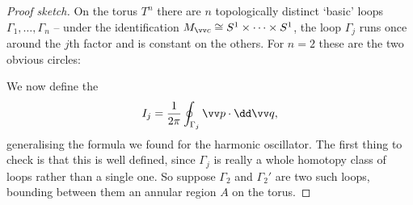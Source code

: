 \begin{proof}[Proof sketch]
	On the torus $T^n$ there are $n$ topologically distinct `basic' loops $\Gamma_1,\dots,\Gamma_n$ -- under the identification $M_{\vv c}\cong S^1\times\cdots\times S^1$, the loop $\Gamma_j$ runs once around the $j$th factor and is constant on the others. For $n=2$ these are the two obvious circles:
	\begin{center}
	\end{center}
	We now define the 
	$$
	I_j = \frac{1}{2\pi}\oint_{\Gamma_j}\vv p\cdot\dd\vv q,
	$$
	generalising the formula we found for the harmonic oscillator. The first thing to check is that this is well defined, since $\Gamma_j$ is really a whole homotopy class of loops rather than a single one. So suppose $\Gamma_2$ and $\Gamma_2'$ are two such loops, bounding between them an annular region $A$ on the torus.


\end{proof}
